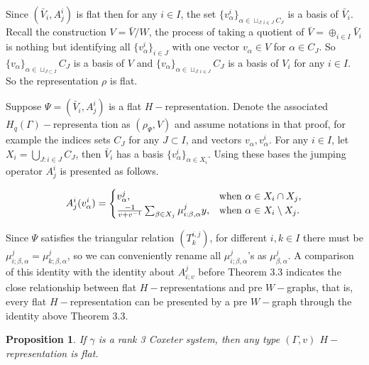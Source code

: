 \def\CTEXPreproc{Created by ctex v0.2.12, don't edit!}\documentclass[11pt]{article}
\newtheorem{prop}{Proposition}[section]
\begin{document}
\begin{pf}
Since  $(\bar{V}_i , A^i _j   )$ is flat then for any $i\in I$, the set
$\{  v^i _{\alpha}  \}_{\alpha \in \sqcup_{J: i\in J}  C_J }$ is a basis of $ \bar{V}_i $. Recall the construction
$ V= \bar{V} / W $, the process of taking a quotient of $\bar{V}=\oplus_{i\in I} \bar{V}_i $ is nothing but identifying all
$\{ v^i _{\alpha } \}_{ i\in J  }$  with one vector $v_{\alpha} \in V$ for $\alpha \in C_J$. So $\{ v _{\alpha}  \}_{\alpha \in \sqcup_{J\subset I} } C_J  $ is a basis of $V$ and $\{ v _{\alpha}  \}_{\alpha \in \sqcup_{J: i\in J } } C_J  $ is a basis of $V_i$ for any $i\in I$. So the representation $\rho$ is flat.\\

\end{pf}


Suppose $\Psi=( \bar{V}_i , A^i _j   )$ is a flat $H-$representation. Denote the associated $H_q (\Gamma)-$representa
tion as $(\rho_{\Psi}, V)$ and assume notations in that proof, for example the indices sets $C_J$ for any $J\subset I$, and vectors $v_{\alpha}, v^i _{\alpha} $.
For any $i\in I$, let $X_i = \bigcup_{J:i\in J} C_J$, then $\bar{V}_i$ has a basis $\{ v^i _{\alpha} \}_{\alpha \in X_i  }$. Using these
bases the jumping operator $A^i _j$ is presented as follows.

\[
A^i _{j} (v^i _{\alpha } )=\begin{cases}
 v^j _{\alpha },   &\text{when $  \alpha\in X_i \cap X_j $},\\
 \frac{-1}{v+ v^{-1}} \sum_{ \beta \in X_j  } \mu^{j}_{i: \beta ,\alpha } y, &\text{when $\alpha \in X_i \setminus X_j $}.\\

 \end{cases}
 \]

Since $\Psi$ satisfies the triangular relation $( T^{i,j} _k )$, for different $i,k\in I$ there must be
$  \mu^{j}_{i; \beta ,\alpha }= \mu^{j}_{k; \beta ,\alpha}   $, so we can conveniently rename all $\mu^j _{i; \beta ,\alpha}$'s as
$\mu^j _{\beta , \alpha}$. A comparison of this identity with the identity about $A^j _{i;v}$ before Theorem 3.3 indicates the close
relationship between flat $H-$representations and pre $W-$graphs, that is, every flat $H-$representation can be presented by a pre $W-$graph through the identity above Theorem 3.3.





\begin{prop} If $\gamma$ is a rank 3 Coxeter system, then any type $(\Gamma,v)$ $H-$representation is flat.

\end{prop}
\end{document}
